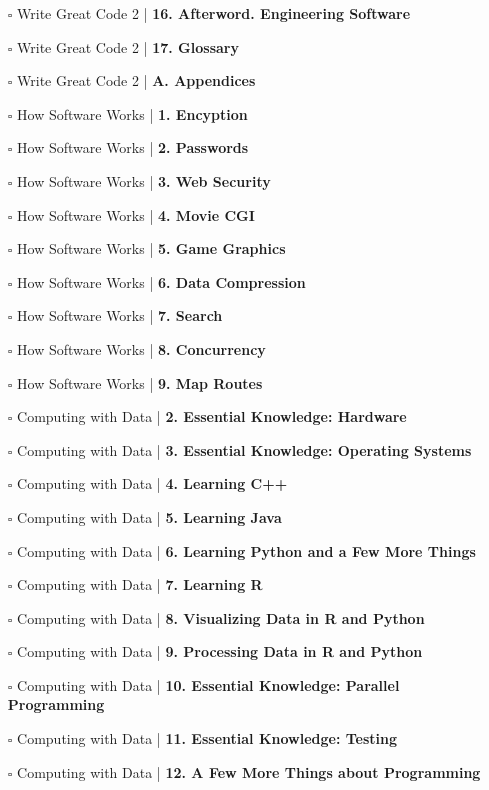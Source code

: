 \documentclass[a4, landscape, 12pt]{article}
\newcommand{\checkbox}{$\square$}%
\begin{document}
\begin{itemize}
{}
\item [\checkbox]  Write Great Code 2 | \textbf{ 16. Afterword. Engineering Software
}
\item [\checkbox]  Write Great Code 2 | \textbf{ 17. Glossary
}
\item [\checkbox]  Write Great Code 2 | \textbf{ A. Appendices
}
\item [\checkbox]  How Software Works | \textbf{ 1. Encyption
}
\item [\checkbox]  How Software Works | \textbf{ 2. Passwords
}
\item [\checkbox]  How Software Works | \textbf{ 3. Web Security
}
\item [\checkbox]  How Software Works | \textbf{ 4. Movie CGI
}
\item [\checkbox]  How Software Works | \textbf{ 5. Game Graphics
}
\item [\checkbox]  How Software Works | \textbf{ 6. Data Compression
}
\item [\checkbox]  How Software Works | \textbf{ 7. Search
}
\item [\checkbox]  How Software Works | \textbf{ 8. Concurrency
}
\item [\checkbox]  How Software Works | \textbf{ 9. Map Routes
}
\item [\checkbox]  Computing with Data | \textbf{ 2. Essential Knowledge: Hardware
}
\item [\checkbox]  Computing with Data | \textbf{ 3. Essential Knowledge: Operating Systems
}
\item [\checkbox]  Computing with Data | \textbf{ 4. Learning C++
}
\item [\checkbox]  Computing with Data | \textbf{ 5. Learning Java
}
\item [\checkbox]  Computing with Data | \textbf{ 6. Learning Python and a Few More Things
}
\item [\checkbox]  Computing with Data | \textbf{ 7. Learning R
}
\item [\checkbox]  Computing with Data | \textbf{ 8. Visualizing Data in R and Python
}
\item [\checkbox]  Computing with Data | \textbf{ 9. Processing Data in R and Python
}
\item [\checkbox]  Computing with Data | \textbf{ 10. Essential Knowledge: Parallel Programming
}
\item [\checkbox]  Computing with Data | \textbf{ 11. Essential Knowledge: Testing
}
\item [\checkbox]  Computing with Data | \textbf{ 12. A Few More Things about Programming
}
\end{itemize}
\end{document}
